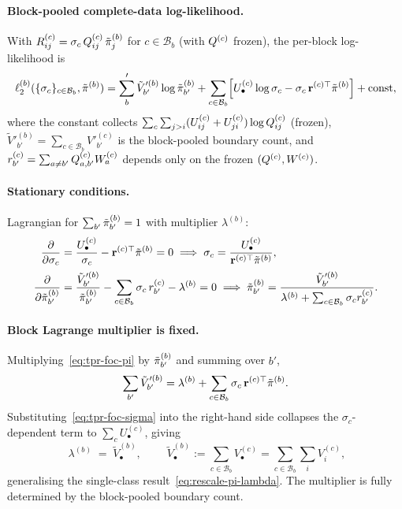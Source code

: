 \paragraph{Block-pooled complete-data log-likelihood.}
With $R^{(c)}_{ij} = \sigma_c\,Q^{(c)}_{ij}\,\tilde{\pi}^{(b)}_j$
for $c \in \mathcal{B}_b$ (with $Q^{(c)}$ frozen), the per-block
log-likelihood is
\begin{equation}\label{eq:tpr-ll}
\ell_2^{(b)}(\{\sigma_c\}_{c\in\mathcal{B}_b}, \tilde{\pi}^{(b)}) =
   \sum_b' \tilde V'^{(b)}_{b'} \log\tilde{\pi}^{(b)}_{b'}
   + \sum_{c\in\mathcal{B}_b}\Bigl[ U^{(c)}_\bullet \log\sigma_c
       - \sigma_c\, \mathbf{r}^{(c)\top} \tilde{\pi}^{(b)} \Bigr]
   + \mathrm{const},
\end{equation}
where the constant collects $\sum_c \sum_{j>i}(U^{(c)}_{ij}+U^{(c)}_{ji})
\log Q^{(c)}_{ij}$ (frozen),
$\tilde V'^{(b)}_{b'} = \sum_{c\in\mathcal{B}_b} V'^{(c)}_{b'}$
is the block-pooled boundary count, and
$r^{(c)}_{b'} = \sum_{a\neq b'} Q^{(c)}_{a,b'} W^{(c)}_a$
depends only on the frozen $(Q^{(c)}, W^{(c)})$.

\paragraph{Stationary conditions.}
Lagrangian for $\sum_{b'}\tilde{\pi}^{(b)}_{b'} = 1$ with multiplier
$\lambda^{(b)}$:
\begin{align}
\frac{\partial}{\partial \sigma_c}
   &= \frac{U^{(c)}_\bullet}{\sigma_c}
        - \mathbf{r}^{(c)\top}\tilde{\pi}^{(b)} = 0
   \;\Longrightarrow\;
   \sigma_c = \frac{U^{(c)}_\bullet}
                   {\mathbf{r}^{(c)\top}\tilde{\pi}^{(b)}},
   \label{eq:tpr-foc-sigma}\\[2pt]
\frac{\partial}{\partial \tilde{\pi}^{(b)}_{b'}}
   &= \frac{\tilde V'^{(b)}_{b'}}{\tilde{\pi}^{(b)}_{b'}}
        - \sum_{c\in\mathcal{B}_b} \sigma_c\,r^{(c)}_{b'}
        - \lambda^{(b)} = 0
   \;\Longrightarrow\;
   \tilde{\pi}^{(b)}_{b'} = \frac{\tilde V'^{(b)}_{b'}}
       {\lambda^{(b)} + \sum_{c\in\mathcal{B}_b} \sigma_c r^{(c)}_{b'}}.
   \label{eq:tpr-foc-pi}
\end{align}

\paragraph{Block Lagrange multiplier is fixed.}
Multiplying~\eqref{eq:tpr-foc-pi} by $\tilde{\pi}^{(b)}_{b'}$ and
summing over $b'$,
\[
\sum_{b'} \tilde V'^{(b)}_{b'}
= \lambda^{(b)} + \sum_{c\in\mathcal{B}_b} \sigma_c\,
     \mathbf{r}^{(c)\top}\tilde{\pi}^{(b)}.
\]
Substituting~\eqref{eq:tpr-foc-sigma} into the right-hand side
collapses the $\sigma_c$-dependent term to $\sum_c U^{(c)}_\bullet$,
giving
\begin{equation}\label{eq:tpr-lambda}
\boxed{\;\lambda^{(b)} \;=\; \tilde V_\bullet^{(b)},\;}
\qquad
\tilde V_\bullet^{(b)} := \sum_{c\in\mathcal{B}_b} V_\bullet^{(c)}
= \sum_{c\in\mathcal{B}_b}\sum_i V^{(c)}_i,
\end{equation}
generalising the single-class result~\eqref{eq:rescale-pi-lambda}.
The multiplier is fully determined by the block-pooled boundary
count.

